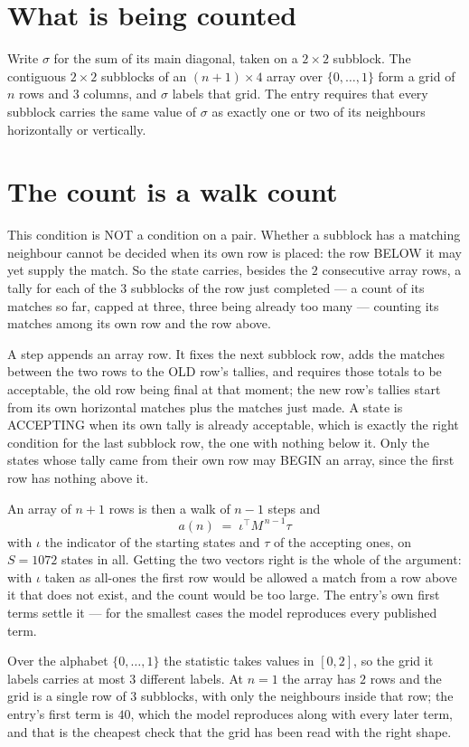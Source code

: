 \documentclass[11pt,a4paper]{article}
\theoremstyle{plain}
\theoremstyle{definition}
\begin{document}
\section{What is being counted}

Write $\sigma$ for the sum of its main diagonal, taken on a $2\times2$ subblock. The contiguous $2\times2$
subblocks of an $(n+1)\times4$ array over $\{0,\dots,1\}$ form a grid of $n$ rows
and $3$ columns, and $\sigma$ labels that grid. The entry
requires that every subblock carries the same value of $\sigma$ as exactly one or two of its neighbours horizontally or vertically.

\section{The count is a walk count}

This condition is NOT a condition on a pair. Whether a subblock has a
matching neighbour cannot be decided when its own row is placed: the row BELOW it may yet
supply the match. So the state carries, besides the $2$ consecutive array rows, a tally for
each of the $3$ subblocks of the row just completed --- a count of its matches so far, capped at three, three being already too many --- counting its matches
among its own row and the row above.

A step appends an array row. It fixes the next subblock row, adds the matches between the two
rows to the OLD row's tallies, and requires those totals to be acceptable, the old row being
final at that moment; the new row's tallies start from its own horizontal matches plus the
matches just made. A state is ACCEPTING when its own tally is already acceptable, which is
exactly the right condition for the last subblock row, the one with nothing below it. Only the
states whose tally came from their own row may BEGIN an array, since the first row has nothing
above it.

An array of $n+1$ rows is then a walk of $n-1$ steps and
\[
a(n)\;=\;\iota^{\!\top}M^{\,n-1}\tau
\]
with $\iota$ the indicator of the starting states and $\tau$ of the accepting ones, on
$S=1072$ states in all. Getting the two vectors right is the whole of the argument: with
$\iota$ taken as all-ones the first row would be allowed a match from a row above it that does
not exist, and the count would be too large. The entry's own first terms settle it --- for
the smallest cases
the model reproduces every published term.

Over the alphabet $\{0,\dots,1\}$ the statistic takes values in $[0,2]$, so the
grid it labels carries at most $3$ different labels. At $n=1$ the array has $2$
rows and the grid is a single row of $3$
subblocks, with only the neighbours inside that row; the entry's first term is
$40$, which the model reproduces along with every later term, and that is the cheapest
check that the grid has been read with the right shape.
\end{document}
